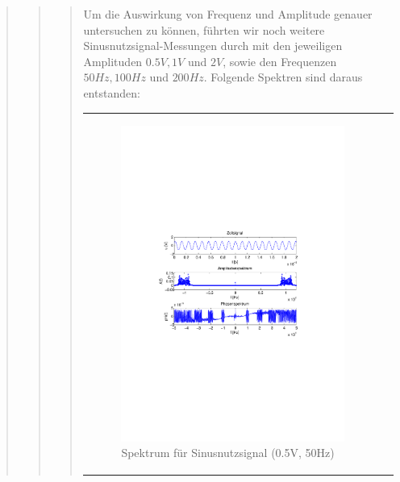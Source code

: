 \begin{quote}
\begin{quote}
\begin{quote}
        Um die Auswirkung von Frequenz und Amplitude genauer untersuchen zu
        können, führten wir noch weitere Sinusnutzsignal-Messungen durch mit den
        jeweiligen Amplituden $0.5V, 1V$ und $2V$, sowie den Frequenzen $50Hz,
        100Hz$ und $200Hz$. Folgende Spektren sind daraus entstanden:
        
               \begin{center}
            \begin{tabular}{ll}

            \hspace{-10em}
                \begin{minipage}{0.6\textwidth}

                    \begin{figure}[H]
                        \label{fig:}
                        \includegraphics[scale=0.5, trim = 4cm 9.5cm 3.5cm
                        9.5cm, clip]{./Bilder/sin_a05_f50}
                        \caption{Spektrum für Sinusnutzsignal (0.5V, 50Hz)}
                    \end{figure}


\end{minipage}
\end{tabular}
\end{center}
\end{quote}
\end{quote}
\end{quote}
